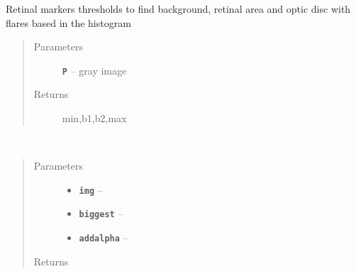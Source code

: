 \documentclass[letterpaper,10pt,english]{sphinxmanual}
\begin{document}

\begin{fulllineitems}
\label{RRtoolbox.tools:RRtoolbox.tools.segmentation.retina_markers_thresh}
Retinal markers thresholds to find background,
retinal area and optic disc with flares based
in the histogram
\begin{quote}\begin{description}
\item[{Parameters}] \leavevmode
\textbf{\texttt{P}} -- gray image

\item[{Returns}] \leavevmode
min,b1,b2,max

\end{description}\end{quote}

\end{fulllineitems}


\begin{fulllineitems}
\label{RRtoolbox.tools:RRtoolbox.tools.segmentation.retinal_mask}~\begin{quote}\begin{description}
\item[{Parameters}] \leavevmode\begin{itemize}
\item {} 
\textbf{\texttt{img}} -- 

\item {} 
\textbf{\texttt{biggest}} -- 

\item {} 
\textbf{\texttt{addalpha}} -- 

\end{itemize}

\item[{Returns}] \leavevmode


\end{description}\end{quote}

\end{fulllineitems}

\end{document}
